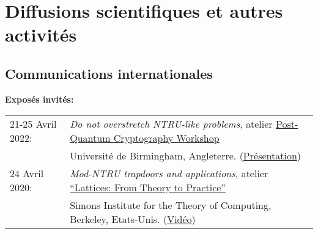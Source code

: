 \documentclass[11pt]{article}
\begin{document}




\section{Diffusions scientifiques et autres activités}

\subsection*{Communications internationales}

\noindent \textbf{Exposés invités:}\\
\hspace{-0.85cm}\begin{tabular}{ll}
                  21-25 Avril 2022: & {\em Do not overstretch NTRU-like problems}, atelier \href{https://sites.google.com/view/pqcworkshop2022/}{Post-Quantum Cryptography Workshop}\\ & Université de Birmingham, Angleterre. (\href{https://awallet.github.io/images/overstretched.pdf}{Présentation})\\
                  
24 Avril 2020: & {\em Mod-NTRU trapdoors and applications}, atelier \href{https://simons.berkeley.edu/workshops/lattices-2020-3}{``Lattices: From Theory to Practice''}\\ & Simons Institute for the Theory of Computing, Berkeley, Etats-Unis. (\href{https://www.youtube.com/watch?v=jWrdAFcvzpk}{Vidéo})
                \end{tabular}\\[5pt]
\end{document}
